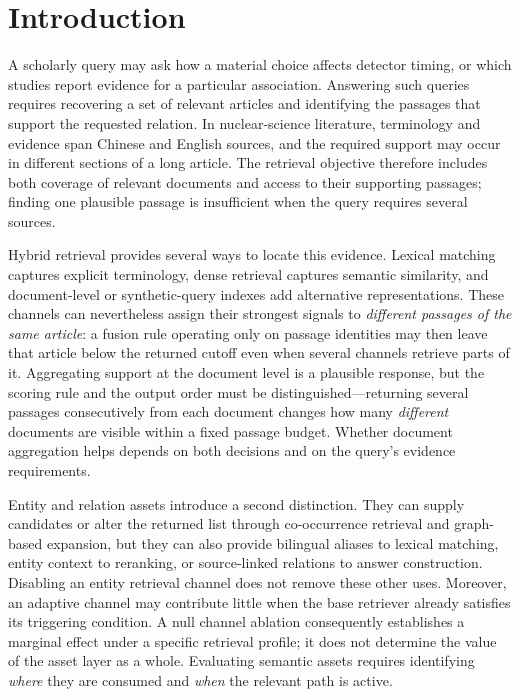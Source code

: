\documentclass[sigconf,nonacm]{acmart}
\begin{document}


\section{Introduction}
\label{sec:intro}

A scholarly query may ask how a material choice affects detector timing,
or which studies report evidence for a particular association. Answering
such queries requires recovering a set of relevant articles and
identifying the passages that support the requested relation. In
nuclear-science literature, terminology and evidence span Chinese and
English sources, and the required support may occur in different
sections of a long article. The retrieval objective therefore includes
both coverage of relevant documents and access to their supporting
passages; finding one plausible passage is insufficient when the query
requires several sources.

Hybrid retrieval provides several ways to locate this evidence. Lexical
matching captures explicit terminology, dense retrieval captures
semantic similarity, and document-level or synthetic-query indexes add
alternative representations. These channels can nevertheless assign
their strongest signals to \emph{different passages of the same
article}: a fusion rule operating only on passage identities may then
leave that article below the returned cutoff even when several channels
retrieve parts of it. Aggregating support at the document level is a
plausible response, but the scoring rule and the output order must be
distinguished---returning several passages consecutively from each
document changes how many \emph{different} documents are visible within
a fixed passage budget. Whether document aggregation helps depends on
both decisions and on the query's evidence requirements.

Entity and relation assets introduce a second distinction. They can
supply candidates or alter the returned list through co-occurrence
retrieval and graph-based expansion, but they can also provide
bilingual aliases to lexical matching, entity context to reranking, or
source-linked relations to answer construction. Disabling an entity
retrieval channel does not remove these other uses. Moreover, an
adaptive channel may contribute little when the base retriever already
satisfies its triggering condition. A null channel ablation consequently
establishes a marginal effect under a specific retrieval profile; it
does not determine the value of the asset layer as a whole. Evaluating
semantic assets requires identifying \emph{where} they are consumed and
\emph{when} the relevant path is active.
\end{document}
